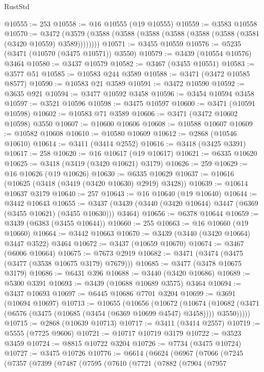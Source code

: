 \begin{lexlean}{RustStd}
\begin{coremodule}
{{{{{{{{{{{{{{{{{{{@10555 := 253
@10558 := @16 @10555 (@19 @10555)
@10559 := @3583 @10558
@10570 := @3472 (@3579 (@3588 (@3588 (@3588 (@3588 (@3588 (@3588 (@3581 (@3420 @10559) @3589))))))))
@10571 := @3455 @10559
@10576 := @5235 (@3471 (@10570 (@3475 @10571)) @3550)
@10579 := @3439 (@10554 @10576) @3464
@10580 := @3437 @10579
@10582 := @3467 (@3455 @10551)
@10583 := @3577 @51
@10585 := @10583 @244 @3589
@10588 := @3471 (@3472 @10585 @8577)
@10590 := @10583 @21 @3589
@10591 := @3472 @10590
@10592 := @3635 @921
@10594 := @3477 @10592 @3458
@10596 := @3454 @10594 @3458
@10597 := @3521 @10596
@10598 := @3475 @10597
@10600 := @3471 (@10591 @10598)
@10602 := @10583 @71 @3589
@10606 := @3471 (@3472 @10602 @10598) @3550
@10607 := @10600 @10606
@10608 := @10588 @10607
@10609 := @10582 @10608
@10610 := @10580 @10609
@10612 := @2868 (@10546 @10610)
@10614 := @3411 (@3414 @2552)
@10616 := @3418 (@3425 @3391)
@10617 := 258
@10620 := @16 @10617 (@19 @10617)
@10621 := @6335 @10620
@10625 := @3418 (@3419 (@3420 @10621) @3179)
@10626 := 259
@10629 := @16 @10626 (@19 @10626)
@10630 := @6335 @10629
@10637 := @10616 (@10625 (@3418 (@3419 (@3420 @10630) @2919) @3428))
@10639 := @10614 @10637 @3179
@10640 := 257
@10643 := @16 @10640 (@19 @10640)
@10644 := @3442 @10643
@10655 := @3437 (@3439 (@3440 (@3420 @10644) @3447 (@6369 (@3455 @10621) (@3455 @10630))) @3464)
@10656 := @6378 @10644
@10659 := @3439 (@6383 (@3455 @10644))
@10660 := 255
@10663 := @16 @10660 (@19 @10660)
@10664 := @3442 @10663
@10670 := @3439 (@3440 (@3420 @10664) @3447 @3522) @3464
@10672 := @3437 (@10659 @10670)
@10674 := @3467 (@6006 @10664)
@10675 := @7673 @2919
@10682 := @3471 (@3474 (@3475 (@3477 (@3538 @10675 @3179) @7679)))
@10685 := @3477 (@3478 @10675 @3179)
@10686 := @6431 @396
@10688 := @3440 (@3420 @10686)
@10689 := @5300 @3391
@10693 := @3439 (@10688 @10689 @3575) @3464
@10694 := @3437 @10693
@10697 := @6445 @10686 @7701 @3204
@10699 := @3691 (@10694 @10697)
@10713 := @10655
    (@10656
      (@10672
        (@10674
          (@10682 (@3471 (@6576 (@3475 (@10685 (@3454 (@6369 @10699 @4547) @3458)))) @3550)))))
@10715 := @2868 (@10639 @10713)
@10717 := @3411 (@3414 @2557)
@10719 := @5555 (@7725 @9606)
@10721 := @10717 @10719 @3179
@10722 := @3523 @3459
@10724 := @8815 @10722 @3204
@10726 := @7734 (@3475 @10724)
@10727 := @3475 @10726
@10776 := @6614
    (@6624
      (@6967
        (@7066
          (@7245
            (@7357
              (@7399
                (@7487
                  (@7595
                    (@7610
                      (@7721
                        (@7882
                          (@7904
                            (@7957
}}}}}}}}}}}}}}}}}}}
\end{coremodule}
\end{lexlean}
